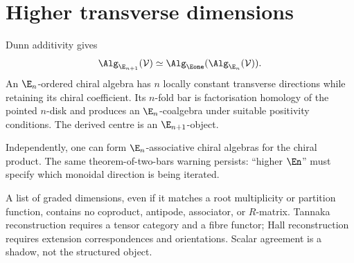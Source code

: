 \section{Higher transverse dimensions}
Dunn additivity gives
\[
 \Alg_{\E_{n+1}}(\mathcal V)
 \simeq\Alg_{\Eone}(\Alg_{\E_n}(\mathcal V)).
\]
An \(\E_n\)-ordered chiral algebra has \(n\) locally constant transverse directions while retaining its chiral coefficient.  Its \(n\)-fold bar is factorisation homology of the pointed \(n\)-disk and produces an \(\E_n\)-coalgebra under suitable positivity conditions.  The derived centre is an \(\E_{n+1}\)-object.

Independently, one can form \(\E_n\)-associative chiral algebras for the chiral product.  The same theorem-of-two-bars warning persists: ``higher \(\En\)'' must specify which monoidal direction is being iterated.

\begin{nogobox}[title={No-go theorem 18: dimension loss does not reconstruct a quantum group}]
A list of graded dimensions, even if it matches a root multiplicity or partition function, contains no coproduct, antipode, associator, or \(R\)-matrix.  Tannaka reconstruction requires a tensor category and a fibre functor; Hall reconstruction requires extension correspondences and orientations.  Scalar agreement is a shadow, not the structured object.
\end{nogobox}
